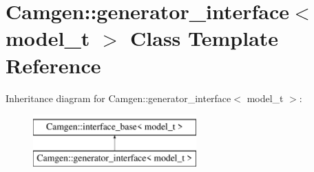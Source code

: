 \hypertarget{a00238}{\section{Camgen\-:\-:generator\-\_\-interface$<$ model\-\_\-t $>$ Class Template Reference}
\label{a00238}
}
Inheritance diagram for Camgen\-:\-:generator\-\_\-interface$<$ model\-\_\-t $>$\-:\begin{figure}[H]
\begin{center}
\leavevmode
\includegraphics[height=2.000000cm]{a00238}
\end{center}
\end{figure}

